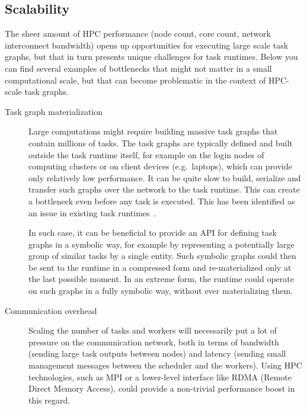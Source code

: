 \subsection{Scalability}
The sheer amount of HPC performance (node count, core count, network interconnect bandwidth)
opens up opportunities for executing large scale task graphs, but that in turn presents
unique challenges for task runtimes. Below you can find several examples of bottlenecks that
might not matter in a small computational scale, but that can become problematic in the context of
HPC-scale task graphs.

\begin{description}
    \item[Task graph materialization] Large computations might require building massive task
    graphs that contain millions of tasks. The task graphs are typically defined and built
    outside the task runtime itself, for example on the login nodes of computing clusters or on
    client devices (e.g.\ laptops), which can provide only relatively low performance. It can be
    quite slow to build, serialize and transfer such graphs over the network to the task
    runtime. This can create a bottleneck even before any task is executed. This has been
    identified as an issue in existing task runtimes~\cite{dask-client-perf}.

    In such case, it can be beneficial to provide an API for defining task graphs in a symbolic
    way, for example by representing a potentially large group of similar tasks by a single
    entity. Such symbolic graphs could then be sent to the runtime in a
    compressed form and re-materialized only at the last possible moment. In an extreme form,
    the runtime could operate on such graphs in a fully symbolic way, without ever
    materializing them.
    \item[Communication overhead] Scaling the number of tasks and workers will necessarily put a
    lot of pressure on the communication network, both in terms of bandwidth (sending large task
    outputs between nodes) and latency (sending small management messages between the scheduler
    and the workers). Using HPC technologies, such as MPI or a lower-level interface like
    RDMA (Remote Direct Memory Access), could provide a non-trivial performance boost in this
    regard.


\end{description}
